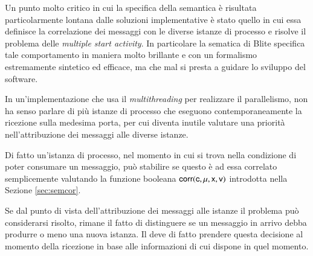 Un punto molto critico in cui la specifica della semantica è
risultata particolarmente lontana dalle soluzioni implementative è stato quello
in cui essa definisce la correlazione dei messaggi con le diverse istanze di
processo e risolve il problema delle \emph{multiple start activity}. In
particolare la sematica di Blite specifica tale comportamento in maniera molto
brillante e con un formalismo estremamente sintetico ed efficace, ma che mal
si presta a guidare lo sviluppo del software. 

In un'implementazione che usa il \emph{multithreading} per realizzare il
parallelismo, non ha senso parlare di più istanze di processo che eseguono
contemporaneamente la ricezione sulla medesima porta, per cui diventa inutile
valutare una priorità nell'attribuzione dei messaggi alle diverse istanze.

Di fatto un'istanza di processo, nel momento in cui si trova nella condizione
di poter consumare un messaggio, può stabilire se questo è ad essa
correlato semplicemente valutando la funzione booleana ${\sf corr}({\sf c},
{\sf \mu}, {\sf x}, {\sf v})$ introdotta nella Sezione \ref{sec:semcor}.



Se dal punto di vista dell'attribuzione dei messaggi alle istanze il problema
può considerarsi risolto, rimane il fatto di distinguere se un
messaggio in arrivo debba produrre o meno una nuova istanza. Il
 deve di fatto prendere questa decisione al momento della
ricezione in base alle informazioni di cui dispone in quel momento. 

